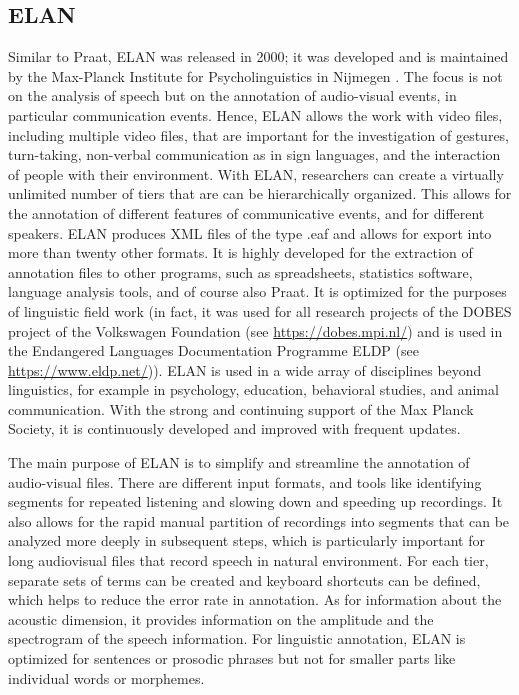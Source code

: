 \subsection{ELAN}

Similar to Praat, ELAN was released in 2000; it was developed and is maintained by the Max-Planck Institute for Psycholinguistics in Nijmegen \cite{sloetjes2008annotation}. The focus is not on the analysis of speech but on the annotation of audio-visual events, in particular communication events. Hence, ELAN allows the work with video files, including multiple video files, that are important for the investigation of gestures, turn-taking, non-verbal communication as in sign languages, and the interaction of people with their environment. With ELAN, researchers can create a virtually unlimited number of tiers that are can be hierarchically organized. This allows for the annotation of different features of communicative events, and for different speakers. ELAN produces XML files of the type .eaf  and allows for export into more than twenty other formats.  It is highly developed for the extraction of annotation files to other programs, such as spreadsheets, statistics software, language analysis tools, and of course also Praat. It is optimized for the purposes of linguistic field work (in fact, it was used for all research projects of the DOBES project of the Volkswagen Foundation (see \url{https://dobes.mpi.nl/}) and is used in the Endangered Languages Documentation Programme ELDP (see \url{https://www.eldp.net/})). ELAN is used in a wide array of disciplines beyond linguistics, for example in psychology, education, behavioral studies, and animal communication. With the strong and continuing support of the Max Planck Society, it is continuously developed and improved with frequent updates. 

The main purpose of ELAN is to simplify and streamline the annotation of audio-visual files. There are different input formats, and tools like identifying segments for repeated listening and slowing down and speeding up recordings. It also allows for the rapid manual partition of recordings into segments that can be analyzed more deeply in subsequent steps, which is particularly important for long audiovisual files that record speech in natural environment. For each tier, separate sets of terms can be created and keyboard shortcuts can be defined, which helps to reduce the error rate in annotation. As for information about the acoustic dimension, it provides information on the amplitude and the spectrogram of the speech information. For linguistic annotation, ELAN is optimized for sentences or prosodic phrases but not for smaller parts like individual words or morphemes.  

